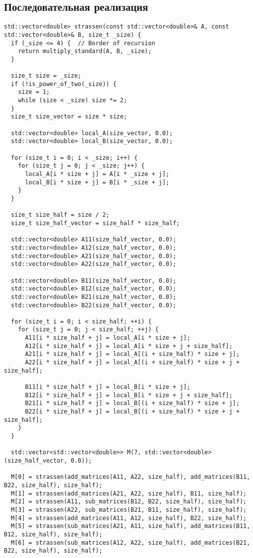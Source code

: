 \documentclass[a4paper, 14pt]{extarticle}
\begin{document}
\subsection{Последовательная реализация}
\begin{lstlisting}
std::vector<double> strassen(const std::vector<double>& A, const std::vector<double>& B, size_t _size) {
  if (_size <= 4) {  // Border of recursion
    return multiply_standard(A, B, _size);
  }

  size_t size = _size;
  if (!is_power_of_two(_size)) {
    size = 1;
    while (size < _size) size *= 2;
  }
  size_t size_vector = size * size;

  std::vector<double> local_A(size_vector, 0.0);
  std::vector<double> local_B(size_vector, 0.0);

  for (size_t i = 0; i < _size; i++) {
    for (size_t j = 0; j < _size; j++) {
      local_A[i * size + j] = A[i * _size + j];
      local_B[i * size + j] = B[i * _size + j];
    }
  }

  size_t size_half = size / 2;
  size_t size_half_vector = size_half * size_half;

  std::vector<double> A11(size_half_vector, 0.0);
  std::vector<double> A12(size_half_vector, 0.0);
  std::vector<double> A21(size_half_vector, 0.0);
  std::vector<double> A22(size_half_vector, 0.0);

  std::vector<double> B11(size_half_vector, 0.0);
  std::vector<double> B12(size_half_vector, 0.0);
  std::vector<double> B21(size_half_vector, 0.0);
  std::vector<double> B22(size_half_vector, 0.0);

  for (size_t i = 0; i < size_half; ++i) {
    for (size_t j = 0; j < size_half; ++j) {
      A11[i * size_half + j] = local_A[i * size + j];
      A12[i * size_half + j] = local_A[i * size + j + size_half];
      A21[i * size_half + j] = local_A[(i + size_half) * size + j];
      A22[i * size_half + j] = local_A[(i + size_half) * size + j + size_half];

      B11[i * size_half + j] = local_B[i * size + j];
      B12[i * size_half + j] = local_B[i * size + j + size_half];
      B21[i * size_half + j] = local_B[(i + size_half) * size + j];
      B22[i * size_half + j] = local_B[(i + size_half) * size + j + size_half];
    }
  }

  std::vector<std::vector<double>> M(7, std::vector<double>(size_half_vector, 0.0));

  M[0] = strassen(add_matrices(A11, A22, size_half), add_matrices(B11, B22, size_half), size_half);
  M[1] = strassen(add_matrices(A21, A22, size_half), B11, size_half);
  M[2] = strassen(A11, sub_matrices(B12, B22, size_half), size_half);
  M[3] = strassen(A22, sub_matrices(B21, B11, size_half), size_half);
  M[4] = strassen(add_matrices(A11, A12, size_half), B22, size_half);
  M[5] = strassen(sub_matrices(A21, A11, size_half), add_matrices(B11, B12, size_half), size_half);
  M[6] = strassen(sub_matrices(A12, A22, size_half), add_matrices(B21, B22, size_half), size_half);


\end{lstlisting}
\end{document}
